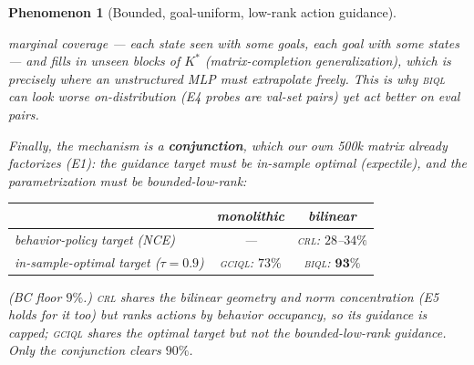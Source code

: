 \documentclass[10pt]{article}
\newtheorem{phenomenon}{Phenomenon}
\begin{document}
\begin{phenomenon}[Bounded, goal-uniform, low-rank action guidance]
\begin{enumerate}[label=(\alph*)]
marginal coverage --- each state seen with \emph{some} goals, each goal with \emph{some}
states --- and fills in unseen blocks of $K^*$ (matrix-completion generalization), which is
precisely where an unstructured MLP must extrapolate freely. This is why \textsc{biql} can
look \emph{worse} on-distribution (E4 probes are val-set pairs) yet act better on eval
pairs.
\end{enumerate}
Finally, the mechanism is a \textbf{conjunction}, which our own 500k matrix already
factorizes (E1): the guidance target must be in-sample \emph{optimal} (expectile), and the
parametrization must be bounded-low-rank:
\begin{center}
\begin{tabular}{lcc}
\toprule
 & monolithic & bilinear \\
\midrule
behavior-policy target (NCE) & --- & \textsc{crl}: $28$--$34\%$ \\
in-sample-optimal target ($\tau{=}0.9$) & \textsc{gciql}: $73\%$ & \textsc{biql}: $\mathbf{93\%}$ \\
\bottomrule
\end{tabular}
\end{center}
(BC floor $9\%$.) \textsc{crl} shares the bilinear geometry and norm concentration (E5
holds for it too) but ranks actions by \emph{behavior} occupancy, so its guidance is capped;
\textsc{gciql} shares the optimal target but not the bounded-low-rank guidance. Only the
conjunction clears $90\%$.
\end{phenomenon}
\end{document}
